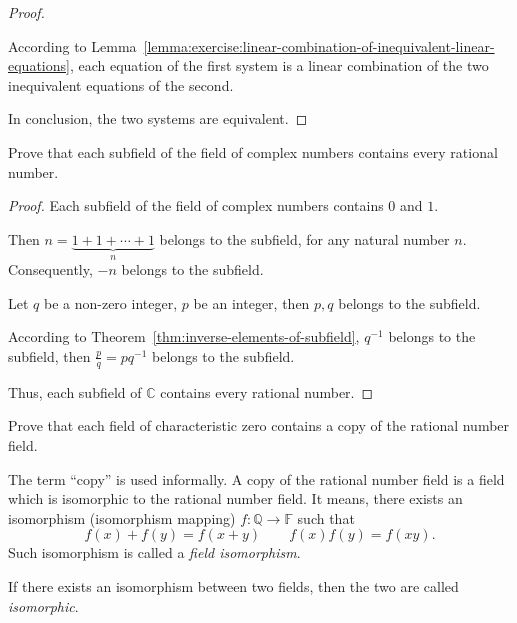 \begin{proof}
\begin{enumerate}[label = \textbf{Case \arabic*.}, itemindent=1cm]
\begin{itemize}
                        According to Lemma~\ref{lemma:exercise:linear-combination-of-inequivalent-linear-equations}, each equation of the first system is a linear combination of the two inequivalent equations of the second.
              \end{itemize}
    \end{enumerate}

    In conclusion, the two systems are equivalent.
\end{proof}

\begin{exercise}
    Prove that each subfield of the field of complex numbers contains every rational number.
\end{exercise}

\begin{proof}
    Each subfield of the field of complex numbers contains $0$ and $1$.

    Then $n = \underbrace{1 + 1 + \cdots + 1}_{n}$ belongs to the subfield, for any natural number $n$. Consequently, $-n$ belongs to the subfield.

    Let $q$ be a non-zero integer, $p$ be an integer, then $p, q$ belongs to the subfield.

    According to Theorem~\ref{thm:inverse-elements-of-subfield}, $q^{-1}$ belongs to the subfield, then $\frac{p}{q} = pq^{-1}$ belongs to the subfield.

    Thus, each subfield of $\mathbb{C}$ contains every rational number.
\end{proof}

\begin{exercise}
    Prove that each field of characteristic zero contains a copy of the rational number field.
\end{exercise}

\begin{note}
    The term ``copy'' is used informally. A copy of the rational number field is a field which is isomorphic to the rational number field. It means, there exists an isomorphism (isomorphism mapping) $f: \mathbb{Q}\to\mathbb{F}$ such that
    \[
        f(x) + f(y) = f(x + y)\qquad f(x)f(y) = f(xy).
    \]
    Such isomorphism is called a \textit{field isomorphism}.

    If there exists an isomorphism between two fields, then the two are called \textit{isomorphic}.
\end{note}

